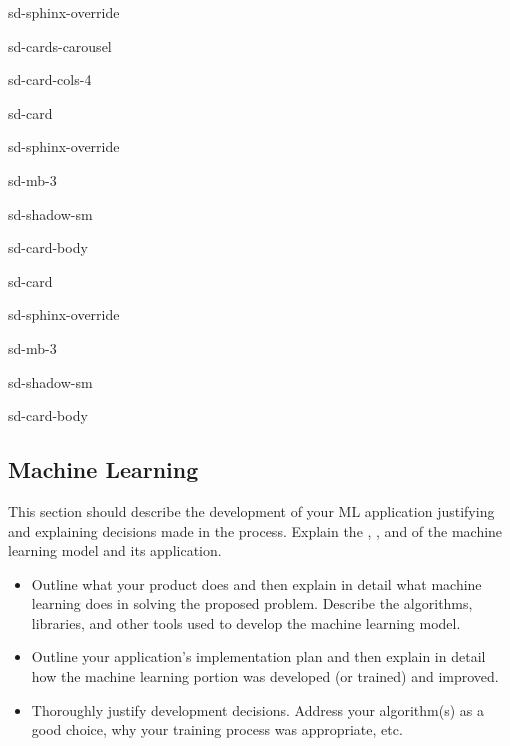 \documentclass[letterpaper,10pt,english]{jupyterBook}
\let\sphinxpxdimen\pdfpxdimen\else\newdimen\sphinxpxdimen
\begin{document}
\begin{sphinxuseclass}{sd-sphinx-override}
\begin{sphinxuseclass}{sd-cards-carousel}
\begin{sphinxuseclass}{sd-card-cols-4}
\begin{sphinxuseclass}{sd-card}
\begin{sphinxuseclass}{sd-sphinx-override}
\begin{sphinxuseclass}{sd-mb-3}
\begin{sphinxuseclass}{sd-shadow-sm}
\begin{sphinxuseclass}{sd-card-body}
\end{sphinxuseclass}
\end{sphinxuseclass}
\end{sphinxuseclass}
\end{sphinxuseclass}
\end{sphinxuseclass}
\begin{sphinxuseclass}{sd-card}
\begin{sphinxuseclass}{sd-sphinx-override}
\begin{sphinxuseclass}{sd-mb-3}
\begin{sphinxuseclass}{sd-shadow-sm}
\begin{sphinxuseclass}{sd-card-body}
\noindent\sphinxincludegraphics[height=100\sphinxpxdimen]{{user_guide5}.png}

\end{sphinxuseclass}
\end{sphinxuseclass}
\end{sphinxuseclass}
\end{sphinxuseclass}
\end{sphinxuseclass}
\end{sphinxuseclass}
\end{sphinxuseclass}
\end{sphinxuseclass}

\subsection{Machine Learning}
\label{\detokenize{task2_doc/task2_doc_d:machine-learning}}\label{\detokenize{task2_doc/task2_doc_d:task2-doc-d-ml}}
\sphinxAtStartPar
This section should describe the development of your ML application justifying and explaining decisions made in the process. Explain the , , and  of the machine learning model and its application.
\begin{itemize}
\item {} 
\sphinxAtStartPar
{} Outline what your product does and then explain in detail what machine learning does in solving the proposed problem. Describe the algorithms, libraries, and other tools used to develop the machine learning model.

\item {} 
\sphinxAtStartPar
{} Outline your application’s implementation plan and then explain in detail how the machine learning portion was developed (or trained) and improved.

\item {} 
\sphinxAtStartPar
{} Thoroughly justify development decisions. Address your algorithm(s) as a  good choice, why your training process was appropriate, etc.

\end{itemize}
\end{document}
